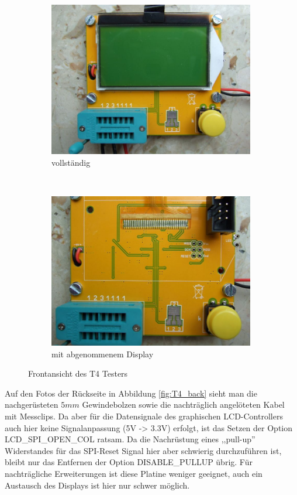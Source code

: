 \begin{figure}[H]
  \begin{subfigure}[b]{9cm}
    \centering
    \includegraphics[width=9cm]{../PNG/T4_front.JPG}
    \caption{vollständig}
  \end{subfigure}
  ~
  \begin{subfigure}[b]{9cm}
    \centering
    \includegraphics[width=9cm]{../PNG/T4_front_noLCD.JPG}
    \caption{mit abgenommenem Display}
  \end{subfigure}
  \caption{Frontansicht des T4 Testers}
  \label{fig:T4_front}
\end{figure}

Auf den Fotos der Rückseite in Abbildung \ref{fig:T4_back} sieht man die nachgerüsteten
\(5mm\) Gewindebolzen sowie die nachträglich angelöteten Kabel mit Messclips.
Da aber für die Datensignale des graphischen LCD-Controllers auch hier
keine Signalanpassung (5V -> 3.3V) erfolgt, ist das Setzen der Option LCD\_SPI\_OPEN\_COL ratsam.
Da die Nachrüstung eines ,,pull-up'' Widerstandes für das SPI-Reset Signal hier
aber schwierig durchzuführen ist, bleibt nur das Entfernen der Option
DISABLE\_PULLUP übrig. 
Für nachträgliche Erweiterungen ist diese Platine weniger geeignet, auch ein Austausch des
Displays ist hier nur schwer möglich.

